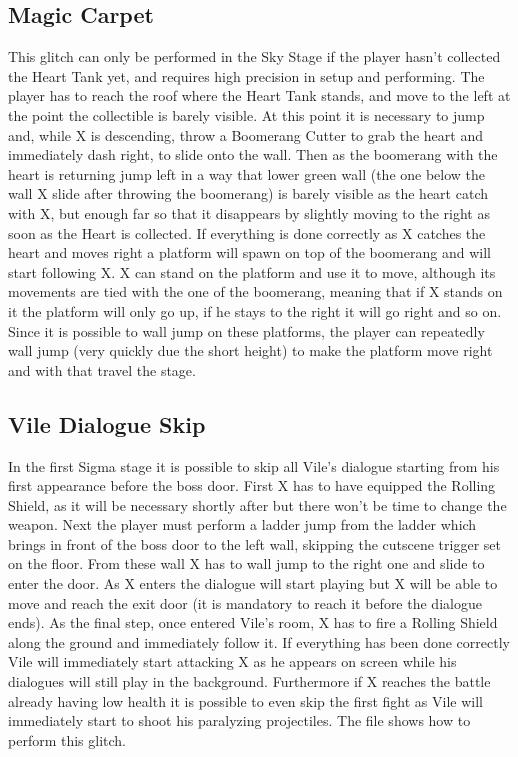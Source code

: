 \subsection{Magic Carpet}
This glitch can only be performed in the Sky Stage if the player hasn't collected the Heart Tank yet, and requires high precision in setup and performing. The player has to reach the roof where the Heart Tank stands, and move to the left at the point the collectible is barely visible. At this point it is necessary to jump and, while X is descending, throw a Boomerang Cutter to grab the heart and immediately dash right, to slide onto the wall. Then as the boomerang with the heart is returning jump left in a way that lower green wall (the one below the wall X slide after throwing the boomerang) is barely visible as the heart catch with X, but enough far so that it disappears by slightly moving to the right as soon as the Heart is collected. If everything is done correctly as X catches the heart and moves right a platform will spawn on top of the boomerang and will start following X. X can stand on the platform and use it to move, although its movements are tied with the one of the boomerang, meaning that if X stands on it the platform will only go up, if he stays to the right it will go right and so on. Since it is possible to wall jump on these platforms, the player can repeatedly wall jump (very quickly due the short height) to make the platform move right and with that travel the stage.

\subsection{Vile Dialogue Skip}
In the first Sigma stage it is possible to skip all Vile's dialogue starting from his first appearance before the boss door. First X has to have equipped the Rolling Shield, as it will be necessary shortly after but there won't be time to change the weapon. Next the player must perform a ladder jump from the ladder which brings in front of the boss door to the left wall, skipping the cutscene trigger set on the floor. From these wall X has to wall jump to the right one and slide to enter the door. As X enters the dialogue will start playing but X will be able to move and reach the exit door (it is mandatory to reach it before the dialogue ends). As the final step, once entered Vile's room, X has to fire a Rolling Shield along the ground and immediately follow it. If everything has been done correctly Vile will immediately start attacking X as he appears on screen while his dialogues will still play in the background. Furthermore if X reaches the battle already having low health it is possible to even skip the first fight as Vile will immediately start to shoot his paralyzing projectiles. The file  shows how to perform this glitch.

